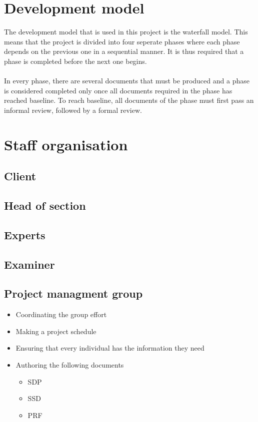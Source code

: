 \documentclass{article}
\begin{document}
\section{Development model} %
    The development model that is used in this project is the waterfall model. This
    means that the project is divided into four seperate phases where each phase depends
    on the previous one in a sequential manner. It is thus required that a phase is
    completed before the next one begins.
    \\ \\
    In every phase, there are several documents that must be produced and a phase
    is considered completed only once all documents required in the phase has reached baseline.
    To reach baseline, all documents of the phase must first pass an informal review, 
    followed by a formal review.
    
\section{Staff organisation} %

    \subsection{Client}
    
    \subsection{Head of section}
    
    \subsection{Experts}
    
    \subsection{Examiner}
    
    \subsection{Project managment group}
        \begin{itemize}
            \item Coordinating the group effort
            \item Making a project schedule
            \item Ensuring that every individual has the information they need
            \item Authoring the following documents
                \begin{itemize}
                    \item SDP
                    \item SSD
                    \item PRF
                \end{itemize} 
        \end{itemize}
    
\end{document}
